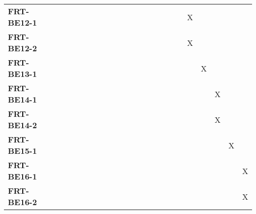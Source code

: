 \documentclass[12pt, titlepage]{article}
\begin{document}
\begin{landscape}
\begin{longtable}{|l|cccccccccccccccc|}
		\textbf{FRT-BE12-1} & ~                                                         & ~            & ~            & ~            & ~            & ~            & ~            & ~            & ~            & ~             & ~             & X             & ~             & ~             & ~             & ~             \\
		\textbf{FRT-BE12-2} & ~                                                         & ~            & ~            & ~            & ~            & ~            & ~            & ~            & ~            & ~             & ~             & X             & ~             & ~             & ~             & ~             \\
		\textbf{FRT-BE13-1} & ~                                                         & ~            & ~            & ~            & ~            & ~            & ~            & ~            & ~            & ~             & ~             & ~             & X             & ~             & ~             & ~             \\
		\textbf{FRT-BE14-1} & ~                                                         & ~            & ~            & ~            & ~            & ~            & ~            & ~            & ~            & ~             & ~             & ~             & ~             & X             & ~             & ~             \\
		\textbf{FRT-BE14-2} & ~                                                         & ~            & ~            & ~            & ~            & ~            & ~            & ~            & ~            & ~             & ~             & ~             & ~             & X             & ~             & ~             \\
		\textbf{FRT-BE15-1} & ~                                                         & ~            & ~            & ~            & ~            & ~            & ~            & ~            & ~            & ~             & ~             & ~             & ~             & ~             & X             & ~             \\
		\textbf{FRT-BE16-1} & ~                                                         & ~            & ~            & ~            & ~            & ~            & ~            & ~            & ~            & ~             & ~             & ~             & ~             & ~             & ~             & X             \\
		\textbf{FRT-BE16-2} & ~                                                         & ~            & ~            & ~            & ~            & ~            & ~            & ~            & ~            & ~             & ~             & ~             & ~             & ~             & ~             & X             \\
		\hline
	\end{longtable}


\end{landscape}
\end{document}
